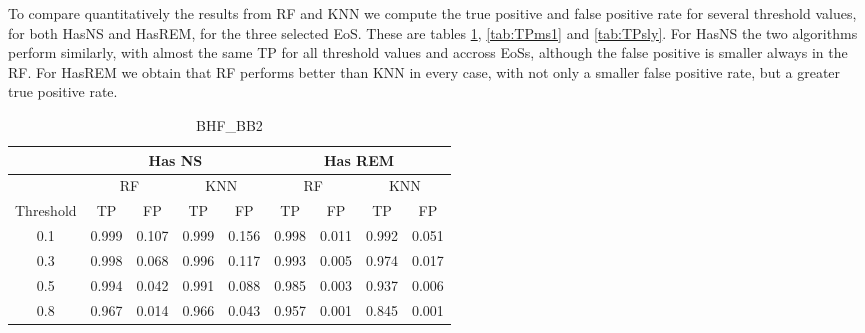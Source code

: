 To compare quantitatively the results from RF and KNN we compute the true positive and false positive rate for several threshold values, for both HasNS and HasREM, for the three selected EoS. These are tables \ref{tab:TPbhf}, \ref{tab:TPms1} and \ref{tab:TPsly}. For HasNS the two algorithms perform similarly, with almost the same TP for all threshold values and accross EoSs, although the false positive is smaller always in the RF. For HasREM we obtain that RF performs better than KNN in every case, with not only a smaller false positive rate, but a greater true positive rate.

\begin{table}[]
\centering
\begin{tabular}{@{}c|cccc|cccc@{}}
\toprule
\multicolumn{1}{l|}{}          & \multicolumn{4}{c|}{Has NS}                       & \multicolumn{4}{c}{Has REM}                      \\ \midrule
                               & \multicolumn{2}{c}{RF} & \multicolumn{2}{c|}{KNN} & \multicolumn{2}{c}{RF} & \multicolumn{2}{c}{KNN} \\
\multicolumn{1}{l|}{Threshold} & TP         & FP        & TP          & FP         & TP         & FP        & TP         & FP         \\ \midrule
0.1                            & 0.999      & 0.107     &   0.999          &  0.156          & 0.998      & 0.011     &    0.992        &  0.051          \\
0.3                            & 0.998      & 0.068     &   0.996        &  0.117          & 0.993      & 0.005     &   0.974         &  0.017          \\
0.5                            & 0.994      & 0.042     &   0.991          &  0.088           & 0.985      & 0.003     &   0.937         &  0.006          \\
0.8                            & 0.967      & 0.014     &   0.966          & 0.043            & 0.957      & 0.001     &  0.845          &   0.001         \\ \bottomrule
\end{tabular}
\caption{BHF\_BB2}
\label{tab:TPbhf}
\end{table}


